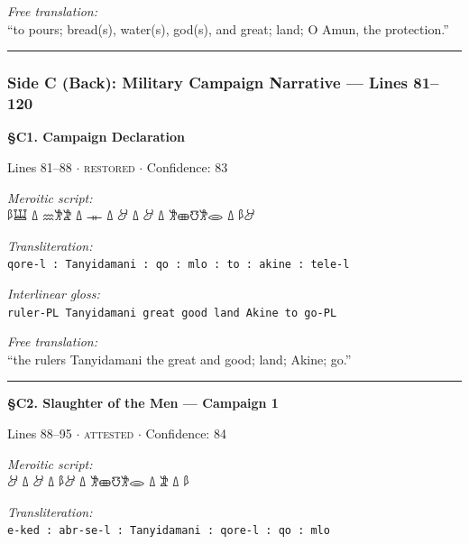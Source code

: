 \documentclass[11pt,a4paper]{article}
\begin{document}
{{{{{{{{{{{{{{\vspace{4pt}
\noindent\textit{Free translation:}\\[2pt]
``to pours; bread(s), water(s), god(s), and great; land; O Amun, the protection.''

\vspace{2pt}
\noindent\rule{\textwidth}{0.3pt}


\subsubsection*{Side C (Back): Military Campaign Narrative --- Lines 81--120}


\vspace{6pt}
\noindent\textbf{\S C1. Campaign Declaration}
\hfill {\small Lines 81–88 $\cdot$ \textsc{restored} $\cdot$ Confidence: 83%

\vspace{3pt}
\noindent\textit{Meroitic script:}\\[2pt]
{\meroitic 𐦃𐦁 𐦗 𐦑𐦂𐦒𐦈𐦂 𐦗 𐦃 𐦗 𐦃 𐦗 𐦔 𐦗 𐦀𐦂𐦊 𐦗 𐦓𐦁}

\vspace{4pt}
\noindent\textit{Transliteration:}\\[2pt]
\texttt{qore-l : Tanyidamani : qo : mlo : to : akine : tele-l}

\vspace{4pt}
\noindent\textit{Interlinear gloss:}\\[2pt]
{\small\texttt{ruler-PL  Tanyidamani  great  good  land  Akine  to go-PL}}

\vspace{4pt}
\noindent\textit{Free translation:}\\[2pt]
``the rulers Tanyidamani the great and good; land; Akine; go.''

\vspace{2pt}
\noindent\rule{\textwidth}{0.3pt}


\vspace{6pt}
\noindent\textbf{\S C2. Slaughter of the Men — Campaign 1}
\hfill {\small Lines 88–95 $\cdot$ \textsc{attested} $\cdot$ Confidence: 84%

\vspace{3pt}
\noindent\textit{Meroitic script:}\\[2pt]
{\meroitic 𐦁 𐦗 𐦀 𐦗 𐦑𐦂𐦒𐦈𐦂 𐦗 𐦃𐦁 𐦗 𐦃 𐦗 𐦃}

\vspace{4pt}
\noindent\textit{Transliteration:}\\[2pt]
\texttt{e-ked : abr-se-l : Tanyidamani : qore-l : qo : mlo}

}}}}}}}}}}}}}}}}
\end{document}
